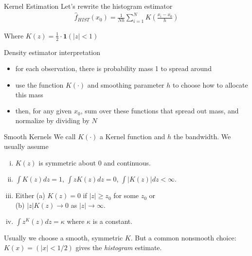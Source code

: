 \begin{frame}{Kernel Estimation}
  Let's rewrite the histogram estimator
  \begin{eqnarray*}
    \hat{f}_{HIST}(x_0) = \frac{1}{Nh} \sum_{i=1}^N  K \left( \frac{x_i - x_0}{h} \right)
  \end{eqnarray*}

  Where $K(z) = \frac{1}{2} \cdot \mathbf{1} (|z| < 1) $
\end{frame}

\begin{frame}{Density estimator interpretation}
  \begin{itemize}
    \item for each observation, there is probability mass 1 to spread around
    \item use the function $K(\cdot)$ and smoothing parameter $h$ to choose how to allocate this mass
    \item then, for any given $x_0$, sum over these functions that spread out mass, and normalize by dividing by $N$
  \end{itemize}
\end{frame}

\begin{frame}{Smooth Kernels}
  We call $K(\cdot)$ a \alert{Kernel function} and $h$ the \alert{bandwidth}. We usually assume
  \begin{enumerate}[(i)]
  \item $K(z)$ is symmetric about $0$ and continuous.
  \item $\int K(z) d z = 1$,  $\int z K(z) d z = 0$,  $\int |K(z)| d z < \infty$.
  \item Either (a) $K(z) = 0$ if $|z| \geq z_0$ for some $z_0$ or \\
  (b) $|z| K(z) \rightarrow 0$ as $|z| \rightarrow \infty$.
  \item $\int z^ K(z) d z = \kappa$ where $\kappa$ is a constant.
  \end{enumerate}

  \pause
  
  \bigskip

  Usually we choose a smooth, symmetric $K$. But a common nonsmooth choice: $K(x)=(|x|<1/2)$ gives the {\em histogram} estimate.

\end{frame}
 
